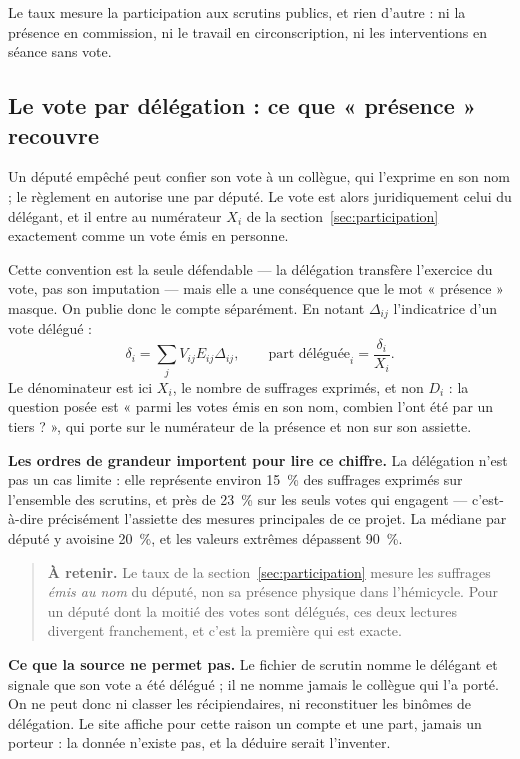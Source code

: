 \documentclass[11pt,a4paper]{article}
\newcommand{\important}[1]{\begin{quote}\small\color{blue!55!black}\textbf{À retenir.} #1\end{quote}}
\begin{document}
Le taux mesure la participation aux scrutins publics, et rien d'autre : ni la
présence en commission, ni le travail en circonscription, ni les interventions
en séance sans vote.

\subsection{Le vote par délégation : ce que « présence » recouvre}
\label{sec:delegation}

Un député empêché peut confier son vote à un collègue, qui l'exprime en son
nom ; le règlement en autorise une par député. Le vote est alors juridiquement
celui du délégant, et il entre au numérateur $X_i$ de la
section~\ref{sec:participation} exactement comme un vote émis en personne.

Cette convention est la seule défendable — la délégation transfère l'exercice
du vote, pas son imputation — mais elle a une conséquence que le mot
« présence » masque. On publie donc le compte séparément. En notant
$\Delta_{ij}$ l'indicatrice d'un vote délégué :
\[
 \delta_i=\sum_j V_{ij}E_{ij}\Delta_{ij},
 \qquad
 \text{part déléguée}_i=\frac{\delta_i}{X_i}.
\]
Le dénominateur est ici $X_i$, le nombre de suffrages exprimés, et non $D_i$ :
la question posée est « parmi les votes émis en son nom, combien l'ont été par
un tiers ? », qui porte sur le numérateur de la présence et non sur son
assiette.

\textbf{Les ordres de grandeur importent pour lire ce chiffre.} La délégation
n'est pas un cas limite : elle représente environ 15~\% des suffrages exprimés
sur l'ensemble des scrutins, et près de 23~\% sur les seuls votes qui engagent
— c'est-à-dire précisément l'assiette des mesures principales de ce projet. La
médiane par député y avoisine 20~\%, et les valeurs extrêmes dépassent 90~\%.

\important{Le taux de la section~\ref{sec:participation} mesure les suffrages
\emph{émis au nom} du député, non sa présence physique dans l'hémicycle. Pour
un député dont la moitié des votes sont délégués, ces deux lectures divergent
franchement, et c'est la première qui est exacte.}

\textbf{Ce que la source ne permet pas.} Le fichier de scrutin nomme le
délégant et signale que son vote a été délégué ; il ne nomme jamais le collègue
qui l'a porté. On ne peut donc ni classer les récipiendaires, ni reconstituer
les binômes de délégation. Le site affiche pour cette raison un compte et une
part, jamais un porteur : la donnée n'existe pas, et la déduire serait
l'inventer.
\end{document}
